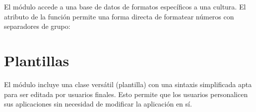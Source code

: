 \documentclass[a5paper,10pt,spanish]{sphinxmanual}
\begin{document}
\sphinxAtStartPar
El módulo  accede a una base de datos de formatos específicos a una cultura.  El atributo  de la función  permite una forma directa de formatear números con separadores de grupo:

\begin{sphinxVerbatim}[commandchars=\\\{\}]
 
 
            
  
  
 \PYG{p}{[}\PYG{p}{]}
                     \PYG{p}{[}\PYG{p}{]}  
\end{sphinxVerbatim}


\section{Plantillas}
\label{\detokenize{tutorial/stdlib2:templating}}\label{\detokenize{tutorial/stdlib2:tut-templating}}
\sphinxAtStartPar
El módulo  incluye una clase versátil  (plantilla) con una sintaxis simplificada apta para ser editada por usuarios finales.  Esto permite que los usuarios personalicen sus aplicaciones sin necesidad de modificar la aplicación en sí.
\end{document}
